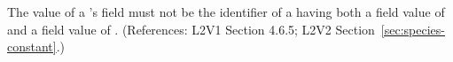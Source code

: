 The value of a \SpeciesReference's  field must not be the
identifier of a \Species having both a  field value of
 and a  field value of .
(References: L2V1 Section 4.6.5; L2V2 Section~\ref{sec:species-constant}.)

